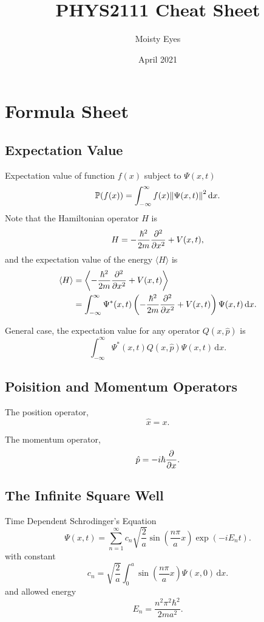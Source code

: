 \documentclass[a4paper]{article}
\title{PHYS2111 Cheat Sheet}
\author{Moisty Eyes}
\date{April 2021}
\newcommand{\dmr}[1]{\, \mathrm{d}#1} %
\begin{document}
\maketitle
\section{Formula Sheet}
\subsection{Expectation Value}


\par Expectation value of function \(f(x)\) subject to \(\Psi(x,t)\)
\[
    \mathbb{P}(f(x))=\int_{-\infty}^{\infty}f(x)\norm{\Psi(x,t)}^{2}\dmr{x}.
\]
Note that the Hamiltonian operator $H$ is 
\[
    H = -\frac{\hbar^2}{2m}\pdv[2]{x} + V(x,t),    
\]
and the expectation value of the energy $\langle H \rangle$ is
\begin{align*}
    \langle H \rangle &= \left\langle -\frac{\hbar^2}{2m}\pdv[2]{x} + V(x,t) \right\rangle\\
    &= \int_{-\infty}^{\infty} \Psi^{*}(x,t) \left(-\frac{\hbar^2}{2m}\pdv[2]{x} + V(x,t)\right) \Psi(x,t)\dmr{x}.
\end{align*}
\par General case, the expectation value for any operator $Q(x,\hat{p})$ is
\[
    \int_{-\infty}^{\infty} \Psi^{*}(x,t) Q(x,\hat{p}) \Psi(x,t) \dmr{x}.     
\]

\subsection{Poisition and Momentum Operators}
\par The position operator,
\[
    \hat{x} = x.
\]
\par The momentum operator,
\[
    \hat{p} = -i\hbar \pdv{x}.
\]

\subsection{The Infinite Square Well}
\par Time Dependent Schrodinger's Equation
\[
    \Psi(x,t) =  \sum_{n=1}^{\infty}c_{n}\sqrt{\frac{2}{a}}\sin\left(\frac{n\pi}{a}x\right)\exp\left(-i E_{n} t\right).
\]
with constant
\[
    c_n = \sqrt{\frac{2}{a}}\int_{0}^{a}\sin\left(\frac{n\pi}{a}x\right)\Psi(x,0)\dmr{x}.
\]
and allowed energy
\[
    E_{n} = \frac{n^2\pi^2\hbar^2}{2ma^2}.
\]
\end{document}
